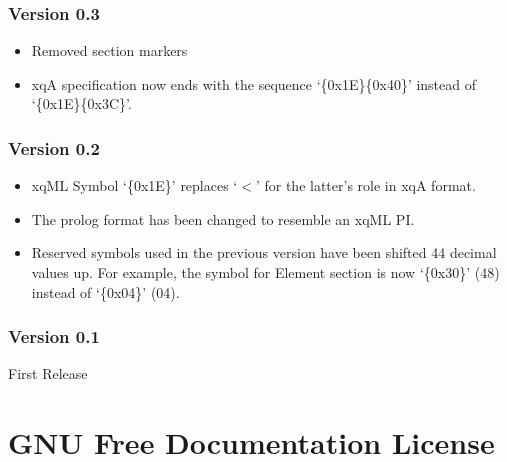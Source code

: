 \documentclass[a4paper]{article}
\begin{document}
\subsubsection{Version 0.3}
\begin{itemize}
\item Removed section markers
\item xqA specification now ends with the sequence `\{0x1E\}\{0x40\}'
  instead of `\{0x1E\}\{0x3C\}'.
\end{itemize}
\subsubsection{Version 0.2}
\begin{itemize}
\item xqML Symbol `\{0x1E\}' replaces `$<$' for the latter's role in
  xqA format.
\item The prolog format has been changed to resemble an xqML PI.
\item Reserved symbols used in the previous version have been shifted
  44 decimal values up. For example, the symbol for Element section is
  now `\{0x30\}' (48) instead of `\{0x04\}' (04).
\end{itemize}
\subsubsection{Version 0.1}
First Release

\section{GNU Free Documentation License} \label{section:gfdl}
\begin{scriptsize}

\end{scriptsize}
\end{document}

